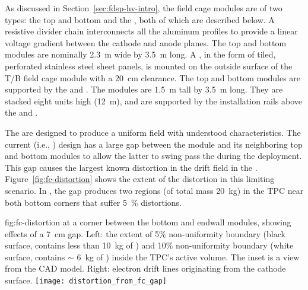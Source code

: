 As discussed in Section~\ref{sec:fdsp-hv-intro}, %
the field cage modules are of two types: the top and bottom  and the , both of which are described below. 
A resistive divider chain interconnects all the aluminum profiles to provide a linear voltage gradient between the cathode and anode planes.  The top and bottom modules are nominally \SI{2.3}{\m} wide by \SI{3.5}{\m} long. A , in the form of tiled, perforated stainless steel sheet panels, is mounted on the outside surface of the T/B field cage module with a \SI{20}{\cm} clearance. The top and bottom  modules are supported by the  and . The  modules are \SI{1.5}{\m} tall by \SI{3.5}{\m} long. They are stacked eight units high (\SI{12}{\m}), and are supported by the installation rails above the  and .

The  are designed to produce a uniform field with understood characteristics.
The current (i.e., )  design has a large gap between the  module and its neighboring top and bottom modules to allow the latter to swing pass the  during the  deployment. This gap causes the largest known distortion in the drift field in the . Figure~\ref{fig:fc-distortion} shows the extent of the distortion in this limiting scenario. In , the gap produces two regions (of total \lar mass \SI{20}{kg}) in the TPC near both bottom corners that suffer \SI{5}{\%} \efield distortions.

\begin{dunefigure}
{fig:fc-distortion}
{\efield at a corner between the bottom and endwall  modules, showing effects of a \SI{7}{cm} gap. Left: the extent of \num{5}\% \efield{} non-uniformity boundary (black surface, contains less than \SI{10}{kg} of \lar) and \num{10}\% non-uniformity boundary (white surface, contains $\sim$ \SI{6}{kg} of \lar) inside the TPC's active volume. The inset is a view from the CAD model.  Right: electron drift lines originating from the cathode surface.}
\texttt{[image: distortion\_from\_fc\_gap]}
\end{dunefigure}

